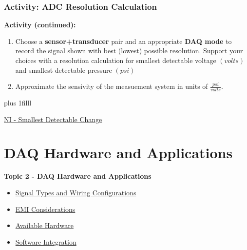 \documentclass[fleqn]{beamer} %
\newcommand{\sectionIItitle}{DAQ Hardware and Applications}
\newcommand{\sectionIsubsectionIVtitle}{Activity: ADC Resolution Calculation}
\newcommand{\sectionIIsubsectionItitle}{Signal Types and Wiring Configurations}
\newcommand{\sectionIIsubsectionIItitle}{EMI Considerations}
\newcommand{\sectionIIsubsectionIIItitle}{Available Hardware}
\newcommand{\sectionIIsubsectionIVtitle}{Software Integration}
\newcommand{\btVFill}{\vskip0pt plus 1filll}
\begin{document}
			\begin{frame}
				\frametitle{\sectionIsubsectionIVtitle} \scriptsize

				\bigskip

				\textbf{Activity (continued):} 
					
				\begin{enumerate}
					
					\item Choose a {\bf sensor+transducer} pair and an appropriate {\bf DAQ mode} to record the signal shown with best (lowest) possible resolution. Support your choices with a resolution calculation for smallest detectable voltage $(volts)$ and smallest detectable pressure $(psi)$ \vspace{10mm}\\

					\item Approximate the sensivity of the measuement system in units of $\frac{psi}{volts}$. 

			
		
				\end{enumerate}	



				\btVFill
	
				{\tiny \href{https://www.ni.com/docs/en-US/bundle/daqhelp/page/codewidth.html}{NI - Smallest Detectable Change}}
										
			\end{frame}
	
	\section{\sectionIItitle}\label{sectionII}

		\begin{frame}
			\large \textbf{Topic 2 - \sectionIItitle} \vspace{3mm}\\

			\begin{itemize}
				\item \hyperlink{sectionIIsubsectionI}{\sectionIIsubsectionItitle} \vspc %
				\item \hyperlink{sectionIIsubsectionII}{\sectionIIsubsectionIItitle} \vspc %
				\item \hyperlink{sectionIIsubsectionIII}{\sectionIIsubsectionIIItitle} \vspc %
				\item \hyperlink{sectionIIsubsectionIV}{\sectionIIsubsectionIVtitle} \vspc %
			\end{itemize}

		\end{frame}
\end{document}
